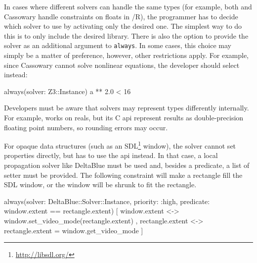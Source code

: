 In cases where different solvers can handle the same types (for
example, both \zthree and Cassowary handle constraints on floats in
\langname/R), the programmer has to decide which solver to use by
activating only the desired one. The simplest way to do this is to
only include the desired library. There is also the option to provide
the solver as an additional argument to \lstinline{always}. In some
cases, this choice may simply be a matter of preference, however,
other restrictions apply. For example, since Cassowary cannot solve
nonlinear equations, the developer should select \zthree instead:
\begin{code}[numbers=none]
always(solver: Z3::Instance) { a ** 2.0 < 16 }
\end{code}
Developers must be aware that solvers may represent types differently
internally. For example, \zthree works on reals, but its C \ac{api}
represent results as double-precision floating point numbers, so
rounding errors may occur.

For opaque data structures (such as an
\textsc{SDL}\footnote{\url{http://libsdl.org/}} window), the solver
cannot set properties directly, but has to use the \DIFdelbegin {}\DIFdelend \ac{api}
instead. In that case, a local propagation solver like DeltaBlue must
be used and, besides a predicate, a list of setter \DIFdelbegin {}\DIFdelend \DIFaddbegin {}\DIFaddend must be
provided. The following constraint will make a rectangle fill the
\textsc{SDL} window, or the window will be shrunk to fit the
rectangle.
\begin{code}
always(solver: DeltaBlue::Solver::Instance,
       priority: :high,
       predicate: {window.extent == rectangle.extent}) {[
  window.extent <-> { window.set_video_mode(rectangle.extent) },
  rectangle.extent <-> { rectangle.extent = window.get_video_mode }
]}
\end{code}

